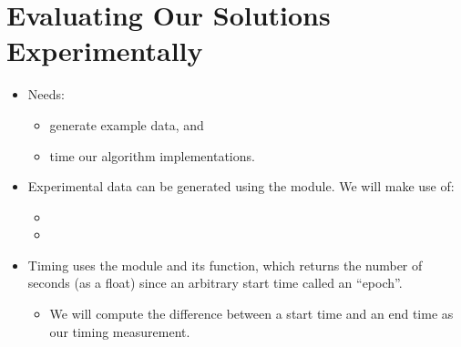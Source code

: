 \documentclass[letterpaper,10pt,english]{sphinxmanual}
\begin{document}
\section{Evaluating Our Solutions Experimentally}
\label{\detokenize{lecture_notes/lec20_searching:evaluating-our-solutions-experimentally}}\begin{itemize}
\item {} 
Needs:
\begin{itemize}
\item {} 
generate example data, and

\item {} 
time our algorithm implementations.

\end{itemize}

\item {} 
Experimental data can be generated using the  module. We
will make use of:
\begin{itemize}
\item {} 

\item {} 

\end{itemize}

\item {} 
Timing uses the  module and its  function, which
returns the number of seconds (as a float) since an arbitrary start
time called an “epoch”.
\begin{itemize}
\item {} 
We will compute the difference between a start time and an end
time as our timing measurement.

\end{itemize}

\end{itemize}
\end{document}
